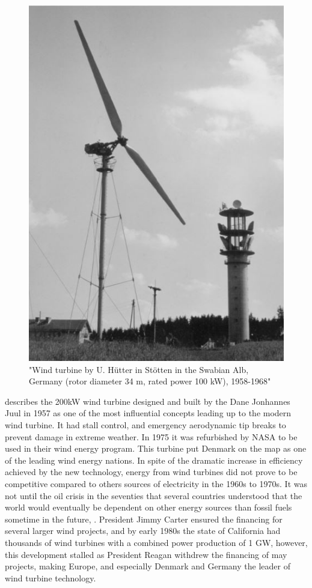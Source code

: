 \begin{figure}[H]
\centering
\includegraphics[scale=0.6]{figures/hutter}
\caption[$\; \:$Hûtter Wind Turbine Concept]{"Wind turbine by U. Hütter in Stötten in the Swabian Alb, Germany (rotor diameter 34 m, rated power 100 kW), 1958-1968" \cite{Hau2013} }
 \label{fig:hutter}
\end{figure}

\noindent \cite{Lynn2011} describes the 200kW wind turbine designed and built by the Dane Jonhannes Juul in 1957 as one of the most influential concepts leading up to the modern wind turbine. It had stall control, and emergency aerodynamic tip breaks to prevent damage in extreme weather. In 1975 it was refurbished by NASA to be used in their wind energy program. This turbine put Denmark on the map as one of the leading wind energy nations. 
\newline 
\newline
\noindent In spite of the dramatic increase in efficiency achieved by the new technology, energy from wind turbines did not prove to be competitive compared to others sources of electricity in the 1960s to 1970s. It was not until the oil crisis in the seventies that several countries understood that the world would eventually be dependent on other energy sources than fossil fuels sometime in the future, \cite{Wagner2013}.  President Jimmy Carter ensured the financing for several larger wind projects, and by early 1980s the state of California had thousands of wind turbines with a combined power production of 1 GW, however, this development stalled as President Reagan withdrew the financing of may projects, making Europe, and especially Denmark and Germany the leader of wind turbine technology. 
\cite{Lynn2011}

